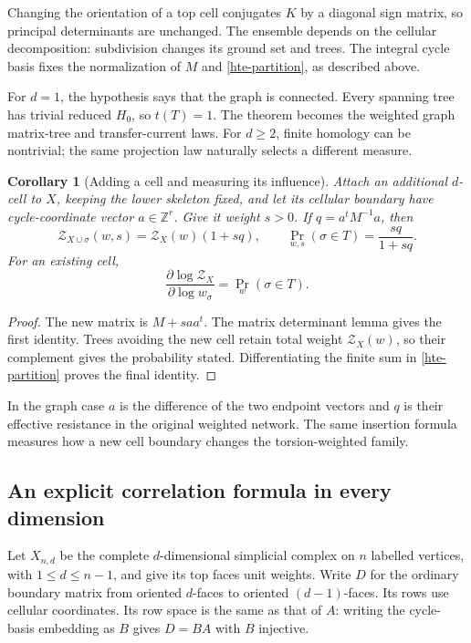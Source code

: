 \documentclass[11pt]{article}
\newtheorem{corollary}[theorem]{Corollary}
\theoremstyle{definition}
\theoremstyle{remark}
\newcommand{\Z}{\mathbb Z}
\begin{document}
Changing the orientation of a top cell conjugates $K$ by a diagonal sign
matrix, so principal determinants are unchanged. The ensemble depends on
the cellular decomposition: subdivision changes its ground set and trees.
The integral cycle basis fixes the normalization of $M$ and
\eqref{hte-partition}, as described above.

For $d=1$, the hypothesis says that the graph is connected. Every spanning
tree has trivial reduced $H_0$, so $t(T)=1$. The theorem becomes the
weighted graph matrix-tree and transfer-current laws. For $d\geq2$,
finite homology can be nontrivial; the same projection law naturally
selects a different measure.

\begin{corollary}[Adding a cell and measuring its influence]
\label{hte-cell-addition}
Attach an additional $d$-cell to $X$, keeping the lower skeleton fixed,
and let its cellular boundary have cycle-coordinate vector $a\in\Z^r$.
Give it weight $s>0$. If $q=a^tM^{-1}a$, then
\[
\mathcal Z_{X\cup\sigma}(w,s)=\mathcal Z_X(w)(1+sq),
\qquad
\Pr_{w,s}(\sigma\in T)=\frac{sq}{1+sq}.
\]
For an existing cell,
\[
\frac{\partial\log\mathcal Z_X}{\partial\log w_\sigma}
=\Pr_w(\sigma\in T).
\]
\end{corollary}

\begin{proof}
The new matrix is $M+saa^t$. The matrix determinant lemma gives the first
identity. Trees avoiding the new cell retain total weight
$\mathcal Z_X(w)$, so their complement gives the probability stated.
Differentiating the finite sum in \eqref{hte-partition} proves the final
identity.
\end{proof}

In the graph case $a$ is the difference of the two endpoint vectors and
$q$ is their effective resistance in the original weighted network.
The same insertion formula measures how a new cell boundary changes the
torsion-weighted family.

\subsection{An explicit correlation formula in every dimension}

Let $X_{n,d}$ be the complete $d$-dimensional simplicial complex on $n$
labelled vertices, with $1\leq d\leq n-1$, and give its top faces unit
weights. Write $D$ for the ordinary boundary matrix from oriented
$d$-faces to oriented $(d-1)$-faces. Its rows use cellular coordinates. Its row space is the same as that of
$A$: writing the cycle-basis embedding as $B$ gives $D=BA$ with $B$ injective.
\end{document}
